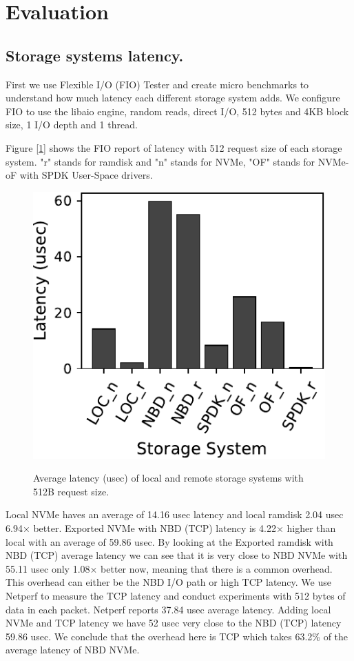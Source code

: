 \section{Evaluation}
\subsection{Storage systems latency.}
\par First we use Flexible I/O (FIO) Tester and create micro benchmarks to understand how much latency each different storage system adds. We configure FIO to use the libaio engine, random reads, direct I/O, 512 bytes and 4KB block size, 1 I/O depth and 1 thread.
\par Figure [\ref{fig:fio_512}] shows the FIO report of latency with 512 request size of each storage system. "r" stands for ramdisk and "n" stands for NVMe, "OF" stands for NVMe-oF with SPDK User-Space drivers.
\begin{figure}[H]
  \includegraphics[width=\linewidth]{asplos25-Thesis/figures/fio_512.pdf}\\
\caption{Average latency (usec) of local and remote storage systems with 512B request size.}
\label{fig:fio_512}
\end{figure}
Local NVMe haves an average of 14.16 usec latency and local ramdisk 2.04 usec 6.94× better. Exported NVMe with NBD (TCP) latency is 4.22× higher than local with an average of 59.86 usec. By looking at the Exported ramdisk with NBD (TCP) average latency we can see that it is very close to NBD NVMe with 55.11 usec only 1.08× better now, meaning that there is a common overhead. This overhead can either be the NBD I/O path or high TCP latency. We use Netperf to measure the TCP latency and conduct experiments with 512 bytes of data in each packet. Netperf reports 37.84 usec average latency. Adding local NVMe and TCP latency we have 52 usec very close to the NBD (TCP) latency 59.86 usec. We conclude that the overhead here is TCP which takes 63.2\% of the average latency of NBD NVMe. 
